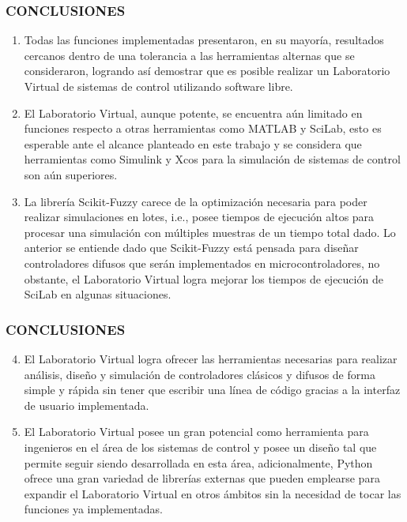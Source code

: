\documentclass[usenames,xcolor={dvipsnames, table}]{beamer}
\begin{document}
\begin{frame}
	\frametitle{CONCLUSIONES}
	\small
	\vspace{20pt}
	\begin{enumerate}
		\justifying
        \item Todas las funciones implementadas presentaron, en su mayoría, resultados cercanos dentro de una tolerancia a las herramientas alternas que se consideraron, logrando así demostrar que es posible realizar un Laboratorio Virtual de sistemas de control utilizando software libre.
        
        \item El Laboratorio Virtual, aunque potente, se encuentra aún limitado en funciones respecto a otras herramientas como MATLAB y SciLab, esto es esperable ante el alcance planteado en este trabajo y se considera que herramientas como Simulink y Xcos para la simulación de sistemas de control son aún superiores.
		
		\item La librería Scikit-Fuzzy carece de la optimización necesaria para poder realizar simulaciones en lotes, i.e., posee tiempos de ejecución altos para procesar una simulación con múltiples muestras de un tiempo total dado. Lo anterior se entiende dado que Scikit-Fuzzy está pensada para diseñar controladores difusos que serán implementados en microcontroladores, no obstante, el Laboratorio Virtual logra mejorar los tiempos de ejecución de SciLab en algunas situaciones.
    \end{enumerate}

\end{frame}

\begin{frame}
	\frametitle{CONCLUSIONES}
	\small
	\vspace{15pt}
	\begin{enumerate}
		\setcounter{enumi}{3}
		\setlength\itemsep{1em}
		\justifying      
        \item El Laboratorio Virtual logra ofrecer las herramientas necesarias para realizar análisis, diseño y simulación de controladores clásicos y difusos de forma simple y rápida sin tener que escribir una línea de código gracias a la interfaz de usuario implementada.
        
        \item El Laboratorio Virtual posee un gran potencial como herramienta para ingenieros en el área de los sistemas de control y posee un diseño tal que permite seguir siendo desarrollada en esta área, adicionalmente, Python ofrece una gran variedad de librerías externas que pueden emplearse para expandir el Laboratorio Virtual en otros ámbitos sin la necesidad de tocar las funciones ya implementadas.
    \end{enumerate}

\end{frame}
\end{document}
